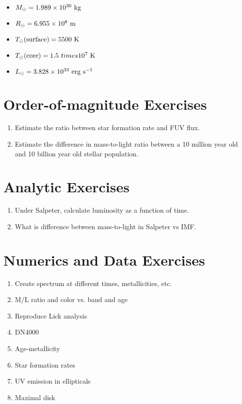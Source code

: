 \begin{itemize}
\item $M_{\odot} = 1.989 \times 10^{30} {\rm ~kg} $
\item $R_{\odot} = 6.955 \times 10^{8} {\rm ~m} $
\item $T_{\odot}{\rm (surface)} = 5500 {\rm ~K} $
\item $T_{\odot}{\rm (core)} = 1.5 \ times 10^7 {\rm ~K} $
\item $L_{\odot} = 3.828 \times 10^{33} {\rm ~erg} {\rm ~s}^{-1}$
\end{itemize}

\section{Order-of-magnitude Exercises}

\begin{enumerate} 
\item Estimate the ratio between star formation rate and FUV flux. 
\item Estimate the difference in mass-to-light ratio between a 10
    million year old and 10 billion year old stellar population.
\end{enumerate} 

\section{Analytic Exercises}

\begin{enumerate}
\item Under Salpeter, calculate luminosity as a function of time.
\item What is difference between mass-to-light in Salpeter vs IMF.
\end{enumerate}

\section{Numerics and Data Exercises}

\begin{enumerate}
\item Create spectrum at different times, metallicities, etc.
\item M/L ratio and color vs. band and age
\item Reproduce Lick analysis
\item DN4000
\item Age-metallicity
\item Star formation rates
\item UV emission in ellipticals
\item Maximal disk
\end{enumerate}


  

